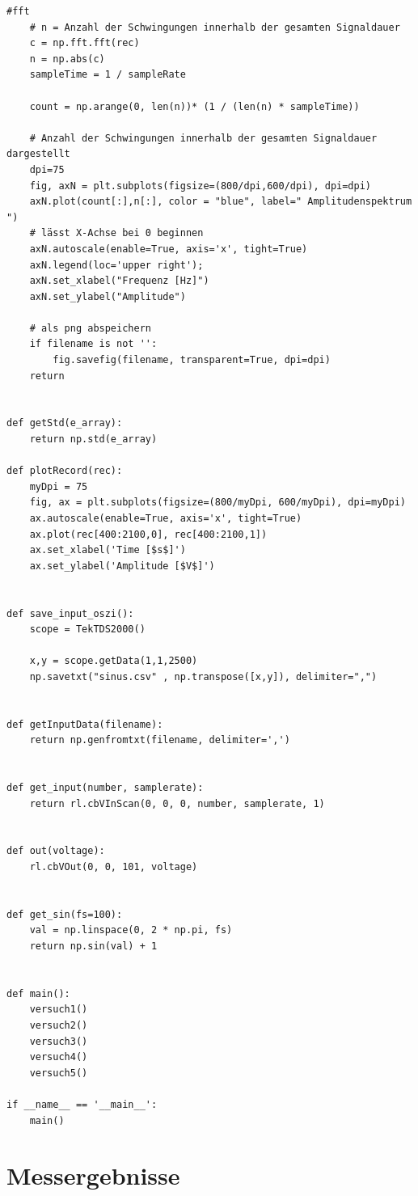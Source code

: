 \documentclass[12pt,oneside,a4paper]{report}
\begin{document}
\begin{lstlisting}[style=PYTHON, frame=single, caption=QuellCodeV1 bis V4, captionpos=b, label=lst:Code]
    #fft
    # n = Anzahl der Schwingungen innerhalb der gesamten Signaldauer
    c = np.fft.fft(rec)
    n = np.abs(c)
    sampleTime = 1 / sampleRate
    
    count = np.arange(0, len(n))* (1 / (len(n) * sampleTime))
    
    # Anzahl der Schwingungen innerhalb der gesamten Signaldauer dargestellt
    dpi=75
    fig, axN = plt.subplots(figsize=(800/dpi,600/dpi), dpi=dpi)
    axN.plot(count[:],n[:], color = "blue", label=" Amplitudenspektrum ")
    # lässt X-Achse bei 0 beginnen
    axN.autoscale(enable=True, axis='x', tight=True)
    axN.legend(loc='upper right');
    axN.set_xlabel("Frequenz [Hz]")
    axN.set_ylabel("Amplitude")
    
    # als png abspeichern    
    if filename is not '':
        fig.savefig(filename, transparent=True, dpi=dpi)
    return


def getStd(e_array):
    return np.std(e_array)

def plotRecord(rec):
    myDpi = 75
    fig, ax = plt.subplots(figsize=(800/myDpi, 600/myDpi), dpi=myDpi)
    ax.autoscale(enable=True, axis='x', tight=True)
    ax.plot(rec[400:2100,0], rec[400:2100,1])
    ax.set_xlabel('Time [$s$]')
    ax.set_ylabel('Amplitude [$V$]')


def save_input_oszi():
    scope = TekTDS2000()

    x,y = scope.getData(1,1,2500)
    np.savetxt("sinus.csv" , np.transpose([x,y]), delimiter=",")


def getInputData(filename):
    return np.genfromtxt(filename, delimiter=',')


def get_input(number, samplerate):
    return rl.cbVInScan(0, 0, 0, number, samplerate, 1)


def out(voltage):
    rl.cbVOut(0, 0, 101, voltage)


def get_sin(fs=100):
    val = np.linspace(0, 2 * np.pi, fs)
    return np.sin(val) + 1


def main():
    versuch1()
    versuch2()
    versuch3()
    versuch4()
    versuch5()

if __name__ == '__main__':
    main()
\end{lstlisting}

\section{Messergebnisse}
\label{chap:APPENDIX_MEASUREMENT_SOURCE}
\end{document}
